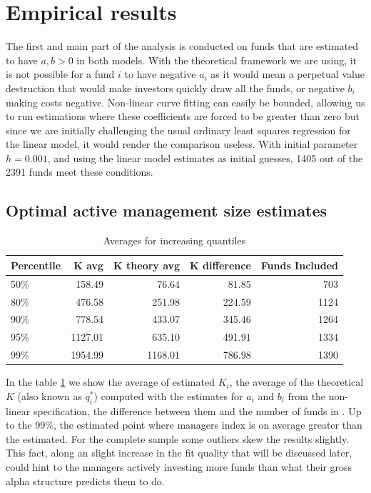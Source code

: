 \documentclass[12pt]{article}
\begin{document}
\section{Empirical results}
The first and main part of the analysis is conducted on funds that are estimated to have $a,b>0$ in both models. With the theoretical framework we are using, it is not possible for a fund $i$ to have negative $a_i$ as it would mean a perpetual value destruction that would make investors quickly draw all the funds, or negative $b_i$ making costs negative. Non-linear curve fitting can easily be bounded, allowing us to run estimations where these coefficients are forced to be greater than zero but since we are initially challenging the usual ordinary least squares regression for the linear model, it would render the comparison useless. With initial parameter $h=0.001$, and using the linear model estimates as initial guesses, 1405 out of the 2391 funds meet these conditions.

\subsection{Optimal active management size estimates}



\begin{table}[h!]
    \centering
    \caption{Averages for increasing quantiles}
    \label{tab:k-means-data}
    \begin{tabular}{lrrrr}
        \hline
        Percentile & K avg & K theory avg & K difference & Funds Included \\
        \hline
        50\% & 158.49 & 76.64 & 81.85 & 703 \\
        80\% & 476.58 & 251.98 & 224.59 & 1124 \\
        90\% & 778.54 & 433.07 & 345.46 & 1264 \\
        95\% & 1127.01 & 635.10 & 491.91 & 1334 \\
        99\% & 1954.99 & 1168.01 & 786.98 & 1390 \\
        \hline
    \end{tabular}
\end{table}

In the table \ref{tab:k-means-data} we show the average of  estimated $K_i$, the average of the theoretical $K$ (also known as $q^*_i$) computed with the estimates for $a_i$ and $b_i$ from the non-linear specification, the difference between them and the number of funds in . Up to the 99\%, the estimated point where managers index is on average greater than the estimated. For the complete sample some outliers skew the results slightly. This fact, along an slight increase in the fit quality that will be discussed later, could hint to the managers actively investing more funds than what their gross alpha structure predicts them to do. 
\end{document}
